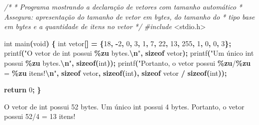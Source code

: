 \documentclass[
  11pt,
  a4paper,
]{scrbook}
\newenvironment{Shaded}{\begin{snugshade}}{\end{snugshade}}
\newcommand{\CommentTok}[1]{\textcolor[rgb]{0.56,0.35,0.01}{\textit{#1}}}
\newcommand{\ControlFlowTok}[1]{\textcolor[rgb]{0.13,0.29,0.53}{\textbf{#1}}}
\newcommand{\DataTypeTok}[1]{\textcolor[rgb]{0.13,0.29,0.53}{#1}}
\newcommand{\DecValTok}[1]{\textcolor[rgb]{0.00,0.00,0.81}{#1}}
\newcommand{\ImportTok}[1]{#1}
\newcommand{\KeywordTok}[1]{\textcolor[rgb]{0.13,0.29,0.53}{\textbf{#1}}}
\newcommand{\NormalTok}[1]{#1}
\newcommand{\OperatorTok}[1]{\textcolor[rgb]{0.81,0.36,0.00}{\textbf{#1}}}
\newcommand{\PreprocessorTok}[1]{\textcolor[rgb]{0.56,0.35,0.01}{\textit{#1}}}
\newcommand{\SpecialCharTok}[1]{\textcolor[rgb]{0.81,0.36,0.00}{\textbf{#1}}}
\newcommand{\StringTok}[1]{\textcolor[rgb]{0.31,0.60,0.02}{#1}}
\begin{document}
\begin{Shaded}
\begin{Highlighting}[]
\CommentTok{/*}
\CommentTok{ * Programa mostrando a declaração de vetores com tamanho automático}
\CommentTok{ * Assegura: apresentação do tamanho de vetor em bytes, do tamanho do }
\CommentTok{ *  tipo base em bytes e a quantidade de itens no vetor}
\CommentTok{ */}
\PreprocessorTok{\#include }\ImportTok{\textless{}stdio.h\textgreater{}}

\DataTypeTok{int}\NormalTok{ main}\OperatorTok{(}\DataTypeTok{void}\OperatorTok{)} \OperatorTok{\{}
    \DataTypeTok{int}\NormalTok{ vetor}\OperatorTok{[]} \OperatorTok{=} \OperatorTok{\{}\DecValTok{18}\OperatorTok{,} \OperatorTok{{-}}\DecValTok{2}\OperatorTok{,} \DecValTok{0}\OperatorTok{,} \DecValTok{3}\OperatorTok{,} \DecValTok{1}\OperatorTok{,} \DecValTok{7}\OperatorTok{,} \DecValTok{22}\OperatorTok{,} \DecValTok{13}\OperatorTok{,} \DecValTok{255}\OperatorTok{,} \DecValTok{1}\OperatorTok{,} \DecValTok{0}\OperatorTok{,} \DecValTok{0}\OperatorTok{,} \DecValTok{3}\OperatorTok{\};}
\NormalTok{    printf}\OperatorTok{(}\StringTok{"O vetor de int possui }\SpecialCharTok{\%zu}\StringTok{ bytes.}\SpecialCharTok{\textbackslash{}n}\StringTok{"}\OperatorTok{,} \KeywordTok{sizeof}\NormalTok{ vetor}\OperatorTok{);}
\NormalTok{    printf}\OperatorTok{(}\StringTok{"Um único int possui }\SpecialCharTok{\%zu}\StringTok{ bytes.}\SpecialCharTok{\textbackslash{}n}\StringTok{"}\OperatorTok{,} \KeywordTok{sizeof}\OperatorTok{(}\DataTypeTok{int}\OperatorTok{));}
\NormalTok{    printf}\OperatorTok{(}\StringTok{"Portanto, o vetor possui }\SpecialCharTok{\%zu}\StringTok{/}\SpecialCharTok{\%zu}\StringTok{ = }\SpecialCharTok{\%zu}\StringTok{ itens!}\SpecialCharTok{\textbackslash{}n}\StringTok{"}\OperatorTok{,}
           \KeywordTok{sizeof}\NormalTok{ vetor}\OperatorTok{,} \KeywordTok{sizeof}\OperatorTok{(}\DataTypeTok{int}\OperatorTok{),} \KeywordTok{sizeof}\NormalTok{ vetor }\OperatorTok{/} \KeywordTok{sizeof}\OperatorTok{(}\DataTypeTok{int}\OperatorTok{));}

    \ControlFlowTok{return} \DecValTok{0}\OperatorTok{;}
\OperatorTok{\}}
\end{Highlighting}
\end{Shaded}

\begin{Shaded}
\begin{Highlighting}[]
\NormalTok{O vetor de int possui 52 bytes.}
\NormalTok{Um único int possui 4 bytes.}
\NormalTok{Portanto, o vetor possui 52/4 = 13 itens!}
\end{Highlighting}
\end{Shaded}
\end{document}
